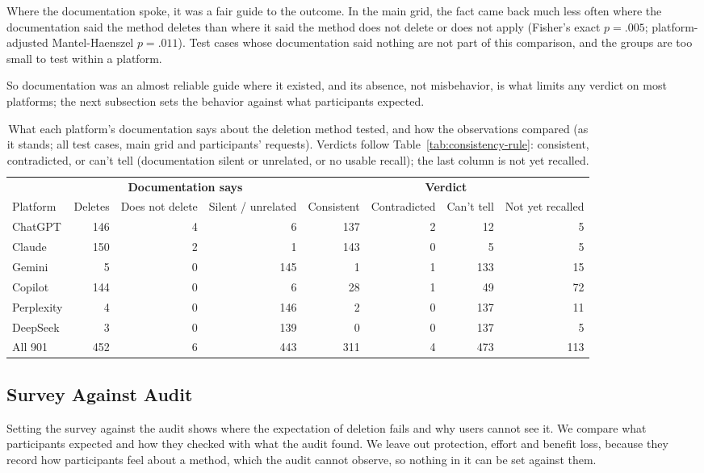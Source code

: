 \documentclass[conference,compsoc]{IEEEtran}
\begin{document}
Where the documentation spoke, it was a fair guide to the outcome.
In the main grid, the fact came back much less often where the documentation said the method deletes than where it said the method does not delete or does not apply (Fisher's exact $p=.005$; platform-adjusted Mantel-Haenszel $p=.011$).
Test cases whose documentation said nothing are not part of this comparison, and the groups are too small to test within a platform.

So documentation was an almost reliable guide where it existed, and its absence, not misbehavior, is what limits any verdict on most platforms; the next subsection sets the behavior against what participants expected.

\begin{table}[t]
\centering
\caption{What each platform's documentation says about the deletion method tested, and how the observations compared (as it stands; all test cases, main grid and participants' requests). Verdicts follow Table~\ref{tab:consistency-rule}: consistent, contradicted, or can't tell (documentation silent or unrelated, or no usable recall); the last column is not yet recalled.}
\label{tab:policy-verdicts}
\small
\begin{tabular}{lrrrrrrr}
\toprule
 & \multicolumn{3}{c}{\textbf{Documentation says}} & \multicolumn{4}{c}{\textbf{Verdict}} \\
\cmidrule(lr){2-4}\cmidrule(lr){5-8}
Platform & Deletes & Does not delete & Silent / unrelated & Consistent & Contradicted & Can't tell & Not yet recalled \\
\midrule
ChatGPT & 146 & 4 & 6 & 137 & 2 & 12 & 5 \\
Claude & 150 & 2 & 1 & 143 & 0 & 5 & 5 \\
Gemini & 5 & 0 & 145 & 1 & 1 & 133 & 15 \\
Copilot & 144 & 0 & 6 & 28 & 1 & 49 & 72 \\
Perplexity & 4 & 0 & 146 & 2 & 0 & 137 & 11 \\
DeepSeek & 3 & 0 & 139 & 0 & 0 & 137 & 5 \\
All 901 & 452 & 6 & 443 & 311 & 4 & 473 & 113 \\
\bottomrule
\end{tabular}
\end{table}

\subsection{Survey Against Audit}
\label{sec:audit-survey-gap}
Setting the survey against the audit shows where the expectation of deletion fails and why users cannot see it.
We compare what participants expected and how they checked with what the audit found.
We leave out protection, effort and benefit loss, because they record how participants feel about a method, which the audit cannot observe, so nothing in it can be set against them.
\end{document}
